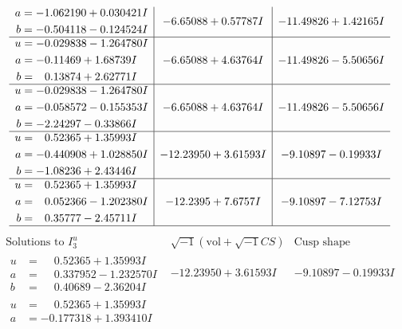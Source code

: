 \documentclass[1p]{elsarticle_modified}
\theoremstyle{definition}
\newcommand{\I}{\sqrt{-1}}
\begin{document}
$$\begin{array}{c|c|c}
\begin{aligned}
a &= -1.062190 + 0.030421 I \\
b &= -0.504118 - 0.124524 I\end{aligned}
 & -6.65088 + 0.57787 I & -11.49826 + 1.42165 I \\ \hline\begin{aligned}
u &= -0.029838 - 1.264780 I \\
a &= -0.11469 + 1.68739 I \\
b &= \phantom{-}0.13874 + 2.62771 I\end{aligned}
 & -6.65088 + 4.63764 I & -11.49826 - 5.50656 I \\ \hline\begin{aligned}
u &= -0.029838 - 1.264780 I \\
a &= -0.058572 - 0.155353 I \\
b &= -2.24297 - 0.33866 I\end{aligned}
 & -6.65088 + 4.63764 I & -11.49826 - 5.50656 I \\ \hline\begin{aligned}
u &= \phantom{-}0.52365 + 1.35993 I \\
a &= -0.440908 + 1.028850 I \\
b &= -1.08236 + 2.43446 I\end{aligned}
 & -12.23950 + 3.61593 I & -9.10897 - 0.19933 I \\ \hline\begin{aligned}
u &= \phantom{-}0.52365 + 1.35993 I \\
a &= \phantom{-}0.052366 - 1.202380 I \\
b &= \phantom{-}0.35777 - 2.45711 I\end{aligned}
 & -12.2395 + 7.6757 I & -9.10897 - 7.12753 I\\
 \hline 
 \end{array}$$\newpage$$\begin{array}{c|c|c}  
\text{Solutions to }I^u_{3}& \I (\text{vol} + \sqrt{-1}CS) & \text{Cusp shape}\\
 \hline 
\begin{aligned}
u &= \phantom{-}0.52365 + 1.35993 I \\
a &= \phantom{-}0.337952 - 1.232570 I \\
b &= \phantom{-}0.40689 - 2.36204 I\end{aligned}
 & -12.23950 + 3.61593 I & -9.10897 - 0.19933 I \\ \hline\begin{aligned}
u &= \phantom{-}0.52365 + 1.35993 I \\
a &= -0.177318 + 1.393410 I \\

\end{aligned}
\end{array}$$
\end{document}
